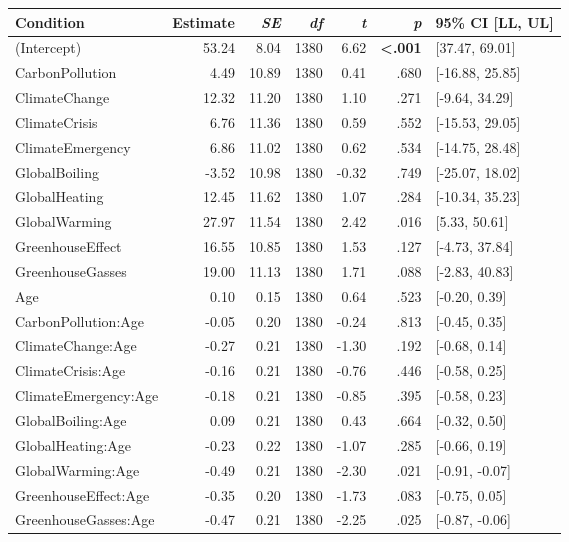 \begin{table}[ht]
\centering
\begin{tabular}{lrrrrrl}
  \hline
Condition & Estimate & \textit{SE} & \textit{df} & \textit{t} & \textit{p} & 95\% CI [LL, UL] \\ 
  \hline
(Intercept) & 53.24 & 8.04 & 1380 & 6.62 & \textbf{\textless  .001} & [37.47, 69.01] \\ 
  CarbonPollution & 4.49 & 10.89 & 1380 & 0.41 & .680 & [-16.88, 25.85] \\ 
  ClimateChange & 12.32 & 11.20 & 1380 & 1.10 & .271 & [-9.64, 34.29] \\ 
  ClimateCrisis & 6.76 & 11.36 & 1380 & 0.59 & .552 & [-15.53, 29.05] \\ 
  ClimateEmergency & 6.86 & 11.02 & 1380 & 0.62 & .534 & [-14.75, 28.48] \\ 
  GlobalBoiling & -3.52 & 10.98 & 1380 & -0.32 & .749 & [-25.07, 18.02] \\ 
  GlobalHeating & 12.45 & 11.62 & 1380 & 1.07 & .284 & [-10.34, 35.23] \\ 
  GlobalWarming & 27.97 & 11.54 & 1380 & 2.42 & .016 & [5.33, 50.61] \\ 
  GreenhouseEffect & 16.55 & 10.85 & 1380 & 1.53 & .127 & [-4.73, 37.84] \\ 
  GreenhouseGasses & 19.00 & 11.13 & 1380 & 1.71 & .088 & [-2.83, 40.83] \\ 
  Age & 0.10 & 0.15 & 1380 & 0.64 & .523 & [-0.20, 0.39] \\ 
  CarbonPollution:Age & -0.05 & 0.20 & 1380 & -0.24 & .813 & [-0.45, 0.35] \\ 
  ClimateChange:Age & -0.27 & 0.21 & 1380 & -1.30 & .192 & [-0.68, 0.14] \\ 
  ClimateCrisis:Age & -0.16 & 0.21 & 1380 & -0.76 & .446 & [-0.58, 0.25] \\ 
  ClimateEmergency:Age & -0.18 & 0.21 & 1380 & -0.85 & .395 & [-0.58, 0.23] \\ 
  GlobalBoiling:Age & 0.09 & 0.21 & 1380 & 0.43 & .664 & [-0.32, 0.50] \\ 
  GlobalHeating:Age & -0.23 & 0.22 & 1380 & -1.07 & .285 & [-0.66, 0.19] \\ 
  GlobalWarming:Age & -0.49 & 0.21 & 1380 & -2.30 & .021 & [-0.91, -0.07] \\ 
  GreenhouseEffect:Age & -0.35 & 0.20 & 1380 & -1.73 & .083 & [-0.75, 0.05] \\ 
  GreenhouseGasses:Age & -0.47 & 0.21 & 1380 & -2.25 & .025 & [-0.87, -0.06] \\ 
   \hline
\end{tabular}
\end{table}
